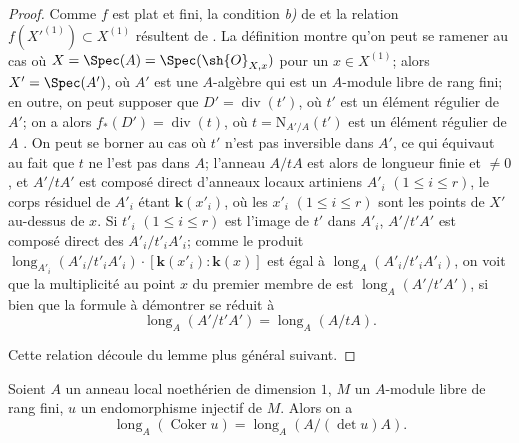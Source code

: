 \begin{proof}
Comme $f$ est plat et fini, la condition \emph{b)} de  et la relation $f(X'^{(1)})\subset X^{(1)}$ résultent de .
La définition  montre qu'on peut se ramener au cas où $X=\Spec(A)=\Spec(\sh{O}_{X,x})$ pour un $x\in X^{(1)}$;
alors $X'=\Spec(A')$, où $A'$ est une
$A$-algèbre qui est un $A$-module libre de rang fini;
en outre, on peut supposer que $D'=\operatorname{div}(t')$, où $t'$ est un élément régulier de $A'$;
on a alors $f_*(D')=\operatorname{div}(t)$, où $t=\mathrm{N}_{A'/A}(t')$ est un élément régulier de $A$ .
On peut se borner au cas où $t'$ n'est pas inversible dans $A'$, ce qui équivaut au fait que $t$ ne l'est pas dans $A$;
l'anneau $A/tA$ est alors de longueur finie et $\neq0$, et $A'/tA'$ est composé direct d'anneaux locaux artiniens $A'_i$ $(1\leq i\leq r)$, le corps résiduel de $A'_i$ étant $\boldsymbol{k}(x'_i)$, où les $x'_i$ $(1\leq i\leq r)$ sont les points de $X'$ au-dessus de $x$.
Si $t'_i$ $(1\leq i\leq r)$ est l'image de $t'$ dans $A'_i$, $A'/t'A'$ est composé direct des $A'_i/t'_iA'_i$;
comme le produit $\operatorname{long}_{A'_i}(A'_i/t'_iA'_i)\cdot[\boldsymbol{k}(x'_i):\boldsymbol{k}(x)]$ est égal à $\operatorname{long}_A(A'_i/t'_iA'_i)$, on voit que la multiplicité au point $x$ du premier membre de  est $\operatorname{long}_A(A'/t'A')$, si bien que la formule à démontrer se réduit à
\[
\label{IV.21.10.17.2}
  \operatorname{long}_A(A'/t'A')=\operatorname{long}_A(A/tA).
  \tag{21.10.17.2}
\]

Cette relation découle du lemme plus général suivant.
\end{proof}

\begin{lemma}[21.10.17.3]
\label{IV.21.10.17.3}
Soient $A$ un anneau local noethérien de dimension $1$, $M$ un $A$-module libre de rang fini, $u$ un endomorphisme injectif de $M$.
Alors on a
\[
\label{IV.21.10.17.4}
  \operatorname{long}_A(\operatorname{Coker}u)=\operatorname{long}_A(A/(\det u)A).
  \tag{21.10.17.4}
\]
\end{lemma}

